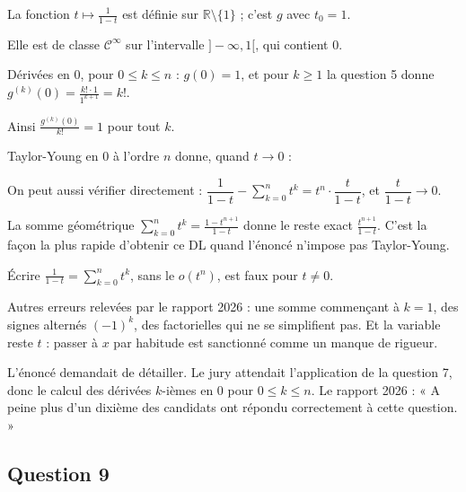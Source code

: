 \documentclass[11pt,a4paper]{article}
\newcommand{\equationajustee}[1]{%
  \sbox{\boiteequation}{$\displaystyle #1$}%
  \ifdim\wd\boiteequation>\linewidth
    \[\resizebox{\linewidth}{!}{\usebox{\boiteequation}}\]%
  \else
    \[#1\]%
  \fi}
\begin{document}
La fonction \(t\mapsto\frac1{1-t}\) est définie sur \(\boxed{\mathbb R\setminus\{1\}}\) ; c'est \(g\) avec \(t_0=1\).

Elle est de classe \(\mathcal C^\infty\) sur l'intervalle \(]-\infty,1[\), qui contient \(0\).

Dérivées en \(0\), pour \(0\le k\le n\) : \(g(0)=1\), et pour \(k\ge1\) la question 5 donne \(g^{(k)}(0)=\frac{k!\cdot1}{1^{k+1}}=k!\).

Ainsi \(\frac{g^{(k)}(0)}{k!}=1\) pour tout \(k\).

Taylor-Young en \(0\) à l'ordre \(n\) donne, quand \(t\to0\) :

\equationajustee{\boxed{\frac1{1-t}=\sum_{k=0}^nt^k+o(t^n)}}

On peut aussi vérifier directement : \(\dfrac1{1-t}-\displaystyle\sum_{k=0}^nt^k=t^n\cdot\dfrac{t}{1-t}\), et \(\dfrac{t}{1-t}\to0\).

\begin{methode}

La somme géométrique \(\sum_{k=0}^nt^k=\frac{1-t^{n+1}}{1-t}\) donne le reste exact \(\frac{t^{n+1}}{1-t}\). C'est la façon la plus rapide d'obtenir ce DL quand l'énoncé n'impose pas Taylor-Young.

\end{methode}

\begin{piege}

Écrire \(\frac1{1-t}=\sum_{k=0}^nt^k\), sans le \(o(t^n)\), est faux pour \(t\neq0\).

Autres erreurs relevées par le rapport 2026 : une somme commençant à \(k=1\), des signes alternés \((-1)^k\), des factorielles qui ne se simplifient pas. Et la variable reste \(t\) : passer à \(x\) par habitude est sanctionné comme un manque de rigueur.

\end{piege}

\begin{jury}

L'énoncé demandait de détailler. Le jury attendait l'application de la question 7, donc le calcul des dérivées \(k\)-ièmes en \(0\) pour \(0\le k\le n\). Le rapport 2026 : « A peine plus d'un dixième des candidats ont répondu correctement à cette question. »

\end{jury}

\hypertarget{question-9}{%
\subsection{Question 9}\label{question-9}}
\end{document}
